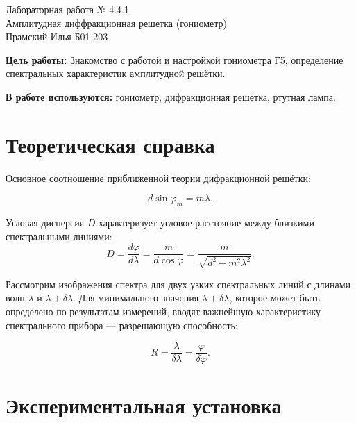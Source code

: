 \documentclass[a4paper,12pt]{article} %
\begin{document}
\begin{center}   
    \hfill \break
	\hfill \break
	\hfill \break
	\large{Лабораторная работа № 4.4.1\\ \hfill \break\Large{Амплитудная диффракционная решетка (гониометр)}}\\\hfill \break\Large{Прамский Илья Б01-203}
\end{center}

\thispagestyle{empty}

\newpage

\textbf{Цель работы:} Знакомство с работой и настройкой гониометра Г5, определение спектральных характеристик амплитудной решётки.

\textbf{В работе используются:} гониометр, дифракционная решётка, ртутная лампа.


\section{Теоретическая справка}

Основное соотношение приближенной теории дифракционной решётки:

	\begin{equation}
	d\sin \varphi_m = m\lambda.
 \label{main}
	\end{equation}
 
Угловая дисперсия $D$ характеризует угловое расстояние между близкими спектральными линиями:
	\begin{equation}
	D = \frac{d\varphi}{d\lambda} = \frac{m}{d \cos \varphi}=\frac{m}{\sqrt{d^{2}-m^{2} \lambda^{2}}}.
	\label{Dispersion}
	\end{equation}

Рассмотрим изображения спектра для двух узких спектральных линий с длинами волн $\lambda$ и $\lambda+\delta\lambda$. Для минимального значения $\lambda+\delta\lambda$, которое может быть определено по результатам измерений, вводят важнейшую характеристику спектрального прибора — разрешающую способность:

\begin{equation}
    R=\frac{\lambda}{\delta\lambda} = \frac{\varphi}{\delta \varphi}.
\end{equation}


\section{Экспериментальная установка}
\end{document}
